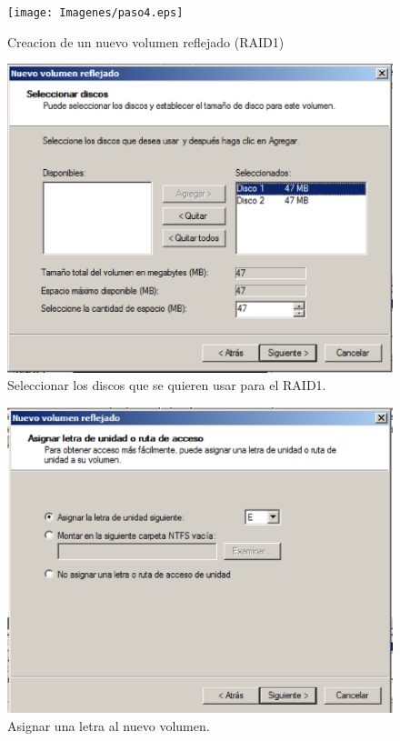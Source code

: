 \begin{figure}[H]
    \begin{center}
        \advance\leftskip-2.1cm
        \texttt{[image: Imagenes/paso4.eps]}
        \caption{Creacion de un nuevo volumen reflejado (RAID1) }
        \label{fig13}
    \end{center}
\end{figure}

\begin{figure}[H]
    \begin{center}
        \includegraphics[scale=0.6]{Imagenes/paso5.eps}
        \caption{Seleccionar los discos que se quieren usar para el RAID1.}
        \label{fig14}
    \end{center}
\end{figure}

\begin{figure}[H]
    \begin{center}
        \includegraphics[scale=0.6]{Imagenes/paso6.eps}
        \caption{Asignar una letra al nuevo volumen.}
        \label{fig15}
    \end{center}
\end{figure}

